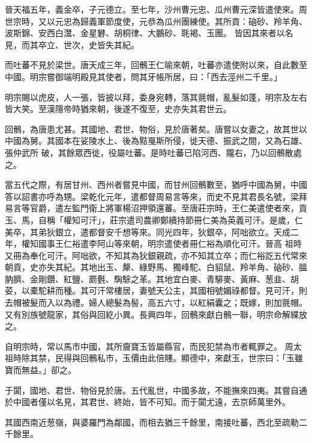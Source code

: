 \begin{pinyinscope}
 晉天福五年，義金卒，子元德立。至七年，沙州曹元忠、瓜州曹元深皆遣使來。周世宗時，又以元忠為歸義軍節度使，元恭為瓜州團練使。其所貢：硇砂、羚羊角、波斯錦、安西白灊、金星礬、胡桐律、大鵬砂、毦褐、玉團。
 皆因其來者以名見，而其卒立、世次，史皆失其紀。



 而吐蕃不見於梁世。唐天成三年，回鶻王仁喻來朝，吐蕃亦遣使附以來，自此數至中國。明宗嘗御端明殿見其使者，問其牙帳所居，曰：「西去涇州二千里。」



 明宗賜以虎皮，人一張，皆披以拜，委身宛轉，落其氈帽，亂髮如蓬，明宗及左右皆大笑。至漢隱帝時猶來朝，後遂不復至，史亦失其君世云。



 回鶻，為唐患尤甚。其國地、君世、物俗，見於唐著矣。唐嘗以女妻之，故其世以中國為舅。其國本在娑陵水上、後為黠戛斯所侵，徙天德、振武之間，又為石雄、張仲武所
 破，其餘眾西徙，役屬吐蕃。是時吐蕃已陷河西、隴右，乃以回鶻散處之。



 當五代之際，有居甘州、西州者嘗見中國，而甘州回鶻數至，猶呼中國為舅，中國答以詔書亦呼為甥。梁乾化元年，遣都督周易言等來，而史不見其君長名號，梁拜易言等官爵，遣左監門衛上將軍楊沼押領還蕃。至唐莊宗時，王仁美遣使者來，貢玉、馬，自稱「權知可汗」，莊宗遣司農卿鄭續持節冊仁美為英義可汗。是歲，仁美卒，其弟狄銀立，遣都督安千想等來。同光四年，狄銀卒，阿咄欲立。天成二年，權知國事王仁裕遣李阿山等來朝，明宗遣使者冊仁裕為順化可汗。晉高
 祖時又冊為奉化可汗。阿咄欲，不知其為狄銀親疏，亦不知其立卒；而仁裕訖五代常來朝貢，史亦失其紀。其地出玉、犛、綠野馬、獨峰駝、白貂鼠、羚羊角、硇砂、膃肭臍、金剛鑽、紅鹽、罽氎、騊駼之革。其地宜白麥、青騑麥、黃麻、葱韭、胡荽，以橐駝耕而種。其可汗常樓居，妻號天公主，其國相號媚祿都督。見可汗，則去帽被髮而入以為禮。婦人總髮為髻，高五六寸，以紅絹囊之；既嫁，則加氈帽。又有別族號龍家，其俗與回紇小異。長興四年，回鶻來獻白鶻一聯，明宗命解緤放之。



 自明宗時，常以馬市中國，其所齎寶玉皆屬縣官，而民犯禁為市者輒罪之。
 周太祖時除其禁，民得與回鶻私市，玉價由此倍賤。顯德中，來獻玉，世宗曰：「玉雖寶而無益。」卻之。



 于闐，國地、君世、物俗見於唐。五代亂世，中國多故，不能撫來四夷。其嘗自通於中國者僅以名見，其君世、終始，皆不可知。而于闐尤遠，去京師萬里外。



 其國西南近葱嶺，與婆羅門為鄰國，而相去猶三千餘里，南接吐蕃，西北至疏勒二千餘里。




\end{pinyinscope}
